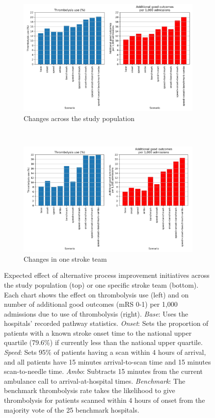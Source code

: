 \begin{figure}[!h]
    \centering
    \begin{subfigure}[b]{1\textwidth}
        \centering
        \includegraphics[width=0.8\linewidth]{images/sim_results_summary}
        \caption{Changes across the study population}
        \label{fig:scenarios_population}
    \end{subfigure}
    \\
    \vspace{8mm}
    \begin{subfigure}[b]{1\textwidth}
        \centering
    \includegraphics[width=0.8\linewidth]{images/sim_results_team_x}
        \caption{Changes in one stroke team}
        \label{fig:scenarios_team}
    \end{subfigure}
    \caption{Expected effect of alternative process improvement initiatives across the study population (top) or one specific stroke team (bottom). Each chart shows the effect on thrombolysis use (left) and on number of additional good outcomes (mRS 0-1) per 1,000 admissions due to use of thrombolysis (right). \textit{Base}: Uses the hospitals’ recorded pathway statistics. \textit{Onset}: Sets the proportion of patients with a known stroke onset time to the national upper quartile (79.6\%) if currently less than the national upper quartile. \textit{Speed}: Sets 95\% of patients having a scan within 4 hours of arrival, and all patients have 15 minutes arrival-to-scan time and 15 minutes scan-to-needle time. \textit{Ambo}: Subtracts 15 minutes from the current ambulance call to arrival-at-hospital times. \textit{Benchmark}: The benchmark thrombolysis rate takes the likelihood to give thrombolysis for patients scanned within 4 hours of onset from the majority vote of the 25 benchmark hospitals.}
    \label{fig:sim_results_summary}
\end{figure}


